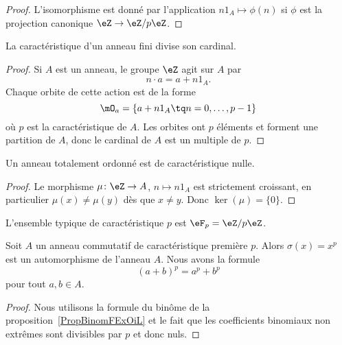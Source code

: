 \begin{proof}
    L'isomorphisme est donné par l'application \( n1_A\mapsto \phi(n)\) si \( \phi\) est la projection canonique \( \eZ\to \eZ/p\eZ\).
\end{proof}

\begin{proposition}     \label{PropGExaUK}
    La caractéristique d'un anneau fini divise son cardinal.
\end{proposition}

\begin{proof}
    Si \( A\) est un anneau, le groupe \( \eZ\) agit sur \( A\) par
    \begin{equation}
        n\cdot a=a+n1_A.
    \end{equation}
    Chaque orbite de cette action est de la forme
    \begin{equation}
        \mO_a=\{ a+n1_A\tq n=0,\ldots, p-1 \}
    \end{equation}
    où \( p\) est la caractéristique de \( A\). Les orbites ont \( p\) éléments et forment une partition de \( A\), donc le cardinal de \( A\) est un multiple de \( p\).
\end{proof}

\begin{lemma}        \label{LEMooJQIKooQgukqn}
    Un anneau totalement ordonné est de caractéristique nulle.
\end{lemma}

\begin{proof}
    Le morphisme \( \mu\colon \eZ\to A\), \( n\mapsto n 1_A\) est strictement croissant, en particulier \( \mu(x)\neq \mu(y)\) dès que \( x\neq y\). Donc \( \ker(\mu)=\{ 0 \}\).
\end{proof}

L'ensemble typique de caractéristique \( p\) est \( \eF_p=\eZ/p\eZ\).



\begin{proposition}     \label{Propqrrdem}
    Soit \( A\) un anneau commutatif de caractéristique première \( p\). Alors \( \sigma(x)=x^p\) est un automorphisme de l'anneau \( A\). Nous avons la formule
    \begin{equation}
        (a+b)^p=a^p+b^p
    \end{equation}
    pour tout \( a,b\in A\).
\end{proposition}

\begin{proof}
    Nous utilisons la formule du binôme de la proposition~\ref{PropBinomFExOiL} et le fait que les coefficients binomiaux non extrêmes sont divisibles par \( p\) et donc nuls.
\end{proof}

